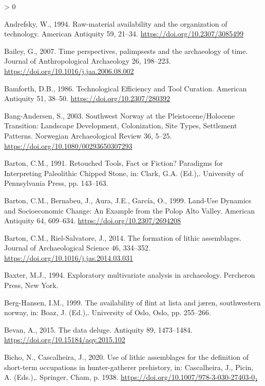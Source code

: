 \documentclass[
]{article}
\newlength{\cslhangindent}
\newenvironment{CSLReferences}[2] %
 {%
  \setlength{\parindent}{0pt}
  \ifodd #1 \everypar{\setlength{\hangindent}{\cslhangindent}}\ignorespaces\fi
  \ifnum #2 > 0
  \setlength{\parskip}{#2\baselineskip}
  \fi
 }%
 {}
\begin{document}
\hypertarget{refs}{}
\begin{CSLReferences}{1}{0}
\leavevmode\hypertarget{ref-andrefsky1994}{}%
Andrefsky, W., 1994. Raw-material availability and the organization of technology. American Antiquity 59, 21--34. \url{https://doi.org/10.2307/3085499}

\leavevmode\hypertarget{ref-bailey2007}{}%
Bailey, G., 2007. Time perspectives, palimpsests and the archaeology of time. Journal of Anthropological Archaeology 26, 198--223. \url{https://doi.org/10.1016/j.jaa.2006.08.002}

\leavevmode\hypertarget{ref-bamforth1986}{}%
Bamforth, D.B., 1986. Technological Efficiency and Tool Curation. American Antiquity 51, 38--50. \url{https://doi.org/10.2307/280392}

\leavevmode\hypertarget{ref-bang-andersen2003}{}%
Bang-Andersen, S., 2003. Southwest Norway at the Pleistocene/Holocene Transition: Landscape Development, Colonization, Site Types, Settlement Patterns. Norwegian Archaeological Review 36, 5--25. \url{https://doi.org/10.1080/00293650307293}

\leavevmode\hypertarget{ref-barton1991}{}%
Barton, C.M., 1991. Retouched Tools, Fact or Fiction? Paradigms for Interpreting Paleolithic Chipped Stone, in: Clark, G.A. (Ed.),. University of Pennsylvania Press, pp. 143--163.

\leavevmode\hypertarget{ref-barton1999}{}%
Barton, C.M., Bernabeu, J., Aura, J.E., García, O., 1999. Land-Use Dynamics and Socioeconomic Change: An Example from the Polop Alto Valley. American Antiquity 64, 609--634. \url{https://doi.org/10.2307/2694208}

\leavevmode\hypertarget{ref-barton2014}{}%
Barton, C.M., Riel-Salvatore, J., 2014. The formation of lithic assemblages. Journal of Archaeological Science 46, 334--352. \url{https://doi.org/10.1016/j.jas.2014.03.031}

\leavevmode\hypertarget{ref-baxter1994}{}%
Baxter, M.J., 1994. Exploratory multivariate analysis in archaeology. Percheron Press, New York.

\leavevmode\hypertarget{ref-berg-hansen1999}{}%
Berg-Hansen, I.M., 1999. The availability of flint at lista and jæren, southwestern norway, in: Boaz, J. (Ed.),. University of Oslo, Oslo, pp. 255--266.

\leavevmode\hypertarget{ref-bevan2015}{}%
Bevan, A., 2015. The data deluge. Antiquity 89, 1473--1484. \url{https://doi.org/10.15184/aqy.2015.102}

\leavevmode\hypertarget{ref-Bicho2020}{}%
Bicho, N., Cascalheira, J., 2020. Use of lithic assemblages for the definition of short-term occupations in hunter-gatherer prehistory, in: Cascalheira, J., Picin, A. (Eds.),. Springer, Cham, p. 1938. \url{https://doi.org/10.1007/978-3-030-27403-0₂}


\end{CSLReferences}
\end{document}
